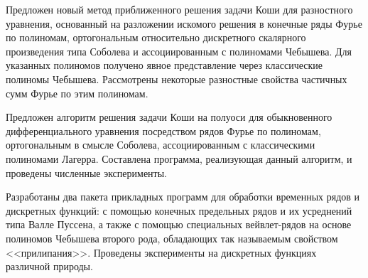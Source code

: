 Предложен новый метод приближенного решения задачи Коши для разностного уравнения, основанный на разложении искомого решения в конечные ряды Фурье по полиномам, ортогональным относительно дискретного скалярного произведения типа Соболева и ассоциированным с полиномами Чебышева. Для указанных полиномов получено явное представление через классические полиномы Чебышева. Рассмотрены некоторые разностные свойства частичных сумм Фурье по этим полиномам.

Предложен алгоритм решения задачи Коши на полуоси для обыкновенного дифференциального уравнения посредством рядов Фурье по полиномам, ортогональным в смысле Соболева, ассоциированным с классическими полиномами Лагерра. Составлена программа, реализующая данный алгоритм, и проведены численные эксперименты.

Разработаны два пакета прикладных программ для обработки временных рядов и дискретных функций: с помощью конечных предельных рядов и их усреднений типа Валле Пуссена, а также с помощью специальных вейвлет-рядов на основе полиномов Чебышева второго рода, обладающих так называемым свойством <<прилипания>>. Проведены эксперименты на дискретных функциях различной природы. 